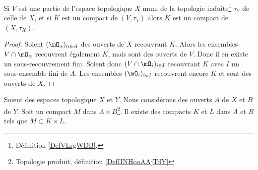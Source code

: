 \begin{proposition}     \label{PropGBZUooRKaOxy}
    Si \( V\) est une partie de l'espace topologique \( X\) muni de la topologie induite\footnote{Définition \ref{DefVLrgWDB}.} \( \tau_V\) de celle de \( X\), et si \( K\) est un compact de \( (V,\tau_V)\) alors \( K\) est un compact de \( (X,\tau_X)\).
\end{proposition}

\begin{proof}
    Soient \(   (\mO_\alpha)_{\alpha\in A}  \) des ouverts de \( X\) recouvrant \( K\). Alors les ensembles \( V\cap \mO_{\alpha}\) recouvrent également \( K\), mais sont des ouverts de \( V\). Donc il en existe un sous-recouvrement fini. Soient donc \( (V\cap\mO_i)_{i\in I}\) recouvrant \( K\) avec \( I\) un sous-ensemble fini de \( A\). Les ensembles \( (\mO_i)_{i\in I}\) recouvrent encore \( K\) et sont des ouverts de \( X\).
\end{proof}

\begin{proposition}
    Soient des espaces topologique \( X\) et \( Y\). Nous considérons des ouverts \( A\) de \( X\) et \( B\) de \( Y\). Soit un compact \( M\) dans \( A\times B\)\footnote{Topologie produit, définition \ref{DefIINHooAAjTdY}}. Il existe des compacts \( K\) et \( L\) dans \( A\) et \( B\) tels que \( M\subset K\times L\).
\end{proposition}

